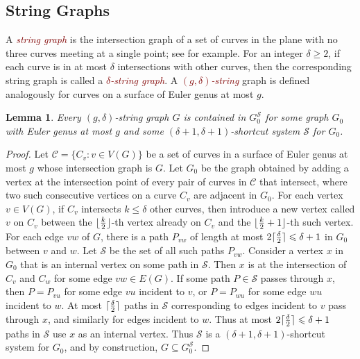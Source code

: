 \documentclass{patmorin}
\theoremstyle{plain}
\newtheorem{lem}[thm]{Lemma}
\theoremstyle{definition}
\newcommand{\defin}[1]{\textcolor{Maroon}{\emph{#1}}}
\DeclarePairedDelimiter{\ceil}{\lceil}{\rceil}
\DeclarePairedDelimiter{\floor}{\lfloor}{\rfloor}
\renewcommand{\SS}{\mathcal{S}}
\renewcommand{\geq}{\geqslant}
\renewcommand{\leq}{\leqslant}
\begin{document}
\subsection{String Graphs}

A \defin{string graph} is the intersection graph of a set of curves in the plane with no three curves meeting at a single point; see  \cite{PachToth-DCG02,FP10,FP14} for example. For an integer $\delta\geq 2$, if each curve is in at most $\delta$ intersections with other curves, then the corresponding string graph is called a \defin{$\delta$-string graph}. A \defin{$(g,\delta)$-string} graph is defined analogously for curves on a surface of Euler genus at most $g$.

\begin{lem}
\label{StringShortcut}
Every $(g,\delta)$-string graph $G$ is contained in $G_0^\SS$ for some graph $G_0$ with Euler genus at most $g$ and some $(\delta+1,\delta+1 )$-shortcut system $\SS$ for $G_0$.
\end{lem}

\begin{proof}
Let $\mathcal{C}=\{C_v:v\in V(G)\}$ be a set of curves in a surface of Euler genus at most $g$ whose intersection graph is $G$.  Let $G_0$ be the graph obtained by adding a vertex at the intersection point of every pair of curves in $\mathcal{C}$ that intersect,  where two such consecutive vertices on a curve $C_v$ are adjacent in $G_0$. For each vertex $v\in V(G)$, if $C_v$ intersects $k\leq\delta$ other curves, then introduce a new vertex called $v$ on $C_v$ between the
$\floor{\frac{k}{2}}$-th vertex already on $C_v$ and the $\floor{\frac{k}{2}+1}$-th such vertex. For each edge $vw$ of $G$, there is a path $P_{vw}$ of length at most $2\ceil{\frac{\delta}{2}}\leq \delta+1$ in $G_0$ between $v$ and $w$. Let $\SS$ be the set of all such paths $P_{vw}$. Consider a vertex $x$ in $G_0$ that is an internal vertex on some path in $\SS$. Then $x$ is at the intersection of $C_v$ and $C_w$ for some edge $vw\in E(G)$. If some path $P\in \SS$ passes through $x$, then $P=P_{vu}$ for some edge $vu$ incident to $v$, or $P=P_{wu}$ for some edge $wu$ incident to $w$. At most $\ceil{\frac{\delta}{2}}$ paths in $\SS$ corresponding to edges incident to $v$ pass through $x$, and similarly for edges incident to $w$. Thus at most $2\ceil{\frac{\delta}{2}}\leq\delta+1$ paths in $\SS$ use $x$ as an internal vertex. Thus $\SS$ is a $(\delta+1,\delta+1)$-shortcut system for $G_0$, and by construction, $G \subseteq G_0^\SS$.
\end{proof}
\end{document}
